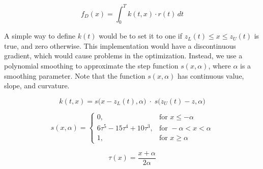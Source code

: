 \begin{equation}
  f_D(x) = \int_0^T \! k(t, x) \cdot r(t) \, dt
\end{equation}

A simple way to define $k(t)$ would be to set it to one if $z_L(t) \leq x \leq z_U(t)$
is true, and zero otherwise.
This implementation would have a discontinuous gradient, which would cause problems in the optimization.
Instead, we use a polynomial smoothing to approximate the step function $s(x,\alpha)$,
where $\alpha$ is a smoothing parameter.
Note that the function $s(x,\alpha)$ has continuous value, slope, and curvature.

\begin{equation}
  k(t, x) = s\big(x - z_L(t), \alpha\big) \; \cdot \; s\big(z_U(t) - z, \alpha\big)
\end{equation}

\begin{equation}
  s(x, \alpha) =
    \begin{cases}
      0, & \text{for } x \leq -\alpha \\
      6\tau^5-15\tau^4+10\tau^3, & \text{for }  -\alpha < x < \alpha\\
      1, & \text{for } x \geq \alpha
    \end{cases}
\end{equation}

\begin{equation}
  \tau(x) = \frac{x + \alpha}{2\alpha}
\end{equation}
